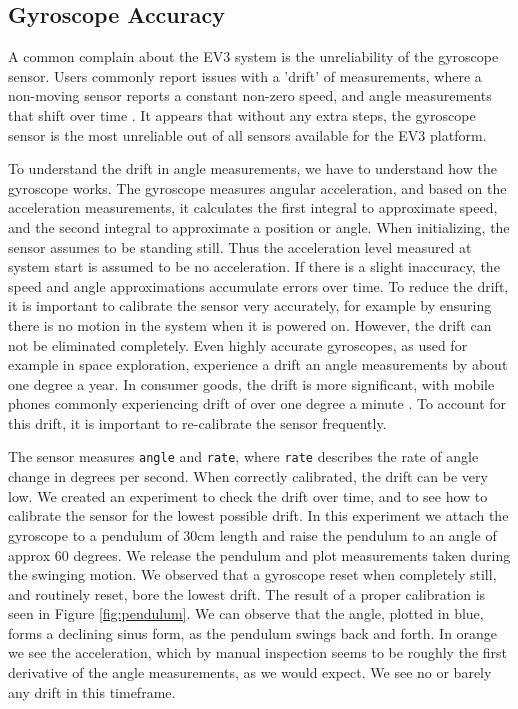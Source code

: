 \documentclass[11pt, a4paper]{article}
\begin{document}
	
	\subsection{Gyroscope Accuracy}
	A common complain about the EV3 system is the unreliability of the gyroscope sensor. Users commonly report issues with a 'drift' of measurements, where a non-moving sensor reports a constant non-zero speed, and angle measurements that shift over time \cite{gyro_inaccurate}. It appears that without any extra steps, the gyroscope sensor is the most unreliable out of all sensors available for the EV3 platform.
	
	To understand the drift in angle measurements, we have to understand how the gyroscope works. The gyroscope measures angular acceleration, and based on the acceleration measurements, it calculates the first integral to approximate speed, and the second integral to approximate a position or angle. When initializing, the sensor assumes to be standing still. Thus the acceleration level measured at system start is assumed to be no acceleration. If there is a slight inaccuracy, the speed and angle approximations accumulate errors over time. To reduce the drift, it is important to calibrate the sensor very accurately, for example by ensuring there is no motion in the system when it is powered on. However, the drift can not be eliminated completely. Even highly accurate gyroscopes, as used for example in space exploration, experience a drift an angle measurements by about one degree a year. In consumer goods, the drift is more significant, with mobile phones commonly experiencing drift of over one degree a minute \cite{gyro_drift}. To account for this drift, it is important to re-calibrate the sensor frequently.
	
	The sensor measures \texttt{angle} and \texttt{rate}, where \texttt{rate} describes the rate of angle change in degrees per second. When correctly calibrated, the drift can be very low. We created an experiment to check the drift over time, and to see how to calibrate the sensor for the lowest possible drift. In this experiment we attach the gyroscope to a pendulum of $30$cm length and raise the pendulum to an angle of approx 60 degrees. We release the pendulum and plot measurements taken during the swinging motion. We observed that a gyroscope reset when completely still, and routinely reset, bore the lowest drift. The result of a proper calibration is seen in Figure \ref{fig:pendulum}. We can observe that the angle, plotted in blue, forms a declining sinus form, as the pendulum swings back and forth. In orange we see the acceleration, which by manual inspection seems to be roughly the first derivative of the angle measurements, as we would expect. We see no or barely any drift in this timeframe.
	
\end{document}
